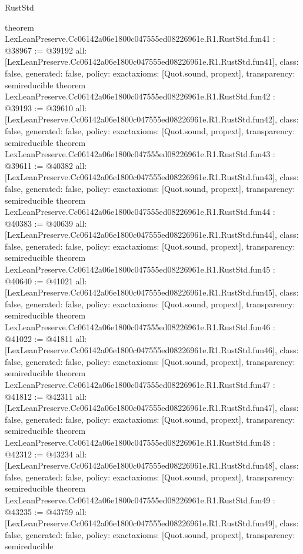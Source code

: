 \begin{lexlean}{RustStd}
\begin{coremodule}
{}
theorem LexLeanPreserve.Cc06142a06e1800c047555ed08226961e.R1.RustStd.fun41 : @38967 := @39192 {
  all: [LexLeanPreserve.Cc06142a06e1800c047555ed08226961e.R1.RustStd.fun41],
  class: false,
  generated: false,
  policy: exact{axioms: [Quot.sound, propext]},
  transparency: semireducible
}
theorem LexLeanPreserve.Cc06142a06e1800c047555ed08226961e.R1.RustStd.fun42 : @39193 := @39610 {
  all: [LexLeanPreserve.Cc06142a06e1800c047555ed08226961e.R1.RustStd.fun42],
  class: false,
  generated: false,
  policy: exact{axioms: [Quot.sound, propext]},
  transparency: semireducible
}
theorem LexLeanPreserve.Cc06142a06e1800c047555ed08226961e.R1.RustStd.fun43 : @39611 := @40382 {
  all: [LexLeanPreserve.Cc06142a06e1800c047555ed08226961e.R1.RustStd.fun43],
  class: false,
  generated: false,
  policy: exact{axioms: [Quot.sound, propext]},
  transparency: semireducible
}
theorem LexLeanPreserve.Cc06142a06e1800c047555ed08226961e.R1.RustStd.fun44 : @40383 := @40639 {
  all: [LexLeanPreserve.Cc06142a06e1800c047555ed08226961e.R1.RustStd.fun44],
  class: false,
  generated: false,
  policy: exact{axioms: [Quot.sound, propext]},
  transparency: semireducible
}
theorem LexLeanPreserve.Cc06142a06e1800c047555ed08226961e.R1.RustStd.fun45 : @40640 := @41021 {
  all: [LexLeanPreserve.Cc06142a06e1800c047555ed08226961e.R1.RustStd.fun45],
  class: false,
  generated: false,
  policy: exact{axioms: [Quot.sound, propext]},
  transparency: semireducible
}
theorem LexLeanPreserve.Cc06142a06e1800c047555ed08226961e.R1.RustStd.fun46 : @41022 := @41811 {
  all: [LexLeanPreserve.Cc06142a06e1800c047555ed08226961e.R1.RustStd.fun46],
  class: false,
  generated: false,
  policy: exact{axioms: [Quot.sound, propext]},
  transparency: semireducible
}
theorem LexLeanPreserve.Cc06142a06e1800c047555ed08226961e.R1.RustStd.fun47 : @41812 := @42311 {
  all: [LexLeanPreserve.Cc06142a06e1800c047555ed08226961e.R1.RustStd.fun47],
  class: false,
  generated: false,
  policy: exact{axioms: [Quot.sound, propext]},
  transparency: semireducible
}
theorem LexLeanPreserve.Cc06142a06e1800c047555ed08226961e.R1.RustStd.fun48 : @42312 := @43234 {
  all: [LexLeanPreserve.Cc06142a06e1800c047555ed08226961e.R1.RustStd.fun48],
  class: false,
  generated: false,
  policy: exact{axioms: [Quot.sound, propext]},
  transparency: semireducible
}
theorem LexLeanPreserve.Cc06142a06e1800c047555ed08226961e.R1.RustStd.fun49 : @43235 := @43759 {
  all: [LexLeanPreserve.Cc06142a06e1800c047555ed08226961e.R1.RustStd.fun49],
  class: false,
  generated: false,
  policy: exact{axioms: [Quot.sound, propext]},
  transparency: semireducible
}
\end{coremodule}
\end{lexlean}
